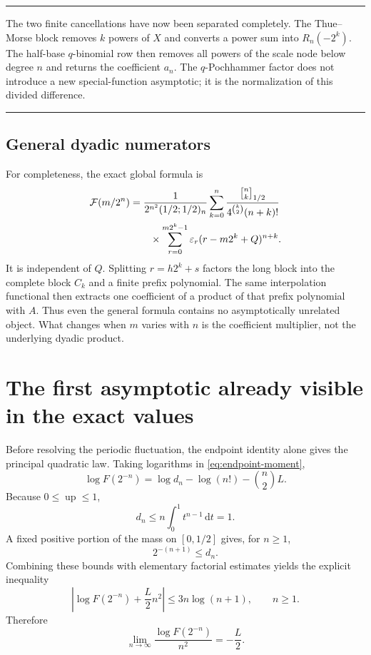 \documentclass[11pt,oneside]{article}
\theoremstyle{definition}
\theoremstyle{remark}
\newcommand{\Up}{\operatorname{up}}
\newcommand{\dd}{\,\mathrm d}
\newcommand{\qbinom}[3]{\genfrac{[}{]}{0pt}{}{#1}{#2}_{#3}}
\newcommand{\epsTM}{\varepsilon}
\newenvironment{boxedremark}{%
  \par\smallskip\noindent\begin{center}\begin{minipage}{0.94\textwidth}%
  \color{black}\hrule\vspace{0.6em}\small
}{%
  \vspace{0.6em}\hrule\end{minipage}\end{center}\smallskip
}
\begin{document}
\begin{boxedremark}
The two finite cancellations have now been separated completely.  The Thue--Morse block
removes $k$ powers of $X$ and converts a power sum into $R_n(-2^k)$.  The half-base
$q$-binomial row then removes all powers of the scale node below degree $n$ and returns the
coefficient $a_n$.  The $q$-Pochhammer factor does not introduce a new special-function
asymptotic; it is the normalization of this divided difference.
\end{boxedremark}

\subsection{General dyadic numerators}

For completeness, the exact global formula is
\begin{align}
 \mathcal F(m/2^n)
 &=\frac{1}{2^{n^2}(1/2;1/2)_n}
 \sum_{k=0}^{n}
 \frac{\qbinom nk{1/2}}{4^{\binom k2}(n+k)!}                \notag\\
 &\qquad\times
 \sum_{r=0}^{m2^k-1}\epsTM_r(r-m2^k+Q)^{n+k}.              \label{eq:q-global}
\end{align}
It is independent of $Q$.  Splitting $r=h2^k+s$ factors the long block into the complete
block $C_k$ and a finite prefix polynomial.  The same interpolation functional then extracts
one coefficient of a product of that prefix polynomial with $A$.  Thus even the general
formula contains no asymptotically unrelated object.  What changes when $m$ varies with $n$
is the coefficient multiplier, not the underlying dyadic product.

\section{The first asymptotic already visible in the exact values}
\label{sec:coarse}

Before resolving the periodic fluctuation, the endpoint identity alone gives the principal
quadratic law.  Taking logarithms in \eqref{eq:endpoint-moment},
\begin{equation}
 \log F(2^{-n})=\log d_n-\log(n!)-\binom n2L.               \label{eq:log-F-exact}
\end{equation}
Because $0\le\Up\le1$,
\begin{equation}
 d_n\le n\int_0^1t^{n-1}\dd t=1.                           \label{eq:dn-upper}
\end{equation}
A fixed positive portion of the mass on $[0,1/2]$ gives, for $n\ge1$,
\begin{equation}
 2^{-(n+1)}\le d_n.                                         \label{eq:dn-lower}
\end{equation}
Combining these bounds with elementary factorial estimates yields the explicit inequality
\begin{equation}
 \left|\log F(2^{-n})+\frac L2n^2\right|
 \le3n\log(n+1),\qquad n\ge1.                              \label{eq:coarse-bound}
\end{equation}
Therefore
\begin{equation}
 \lim_{n\to\infty}\frac{\log F(2^{-n})}{n^2}=-\frac L2.    \label{eq:coarse-limit}
\end{equation}
\end{document}
